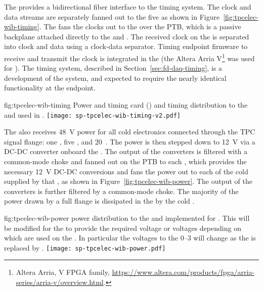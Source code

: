 The   provides a bidirectional fiber interface to the
timing system. The clock and data
streams are separately fanned out to the five  as shown in
Figure~\ref{fig:tpcelec-wib-timing}. The  fans the clocks out to the  over the
PTB, which is a passive backplane attached directly to the  and
.  The received clock on the  is separated into clock and
data using a clock-data separator. Timing endpoint firmware to receive and transmit
the clock is integrated in the   (the Altera Arria V\footnote{Altera Arria\texttrademark{}, V FPGA family, \url{https://www.altera.com/products/fpga/arria-series/arria-v/overview.html}.} was used for ).
The  timing system, described in Section~\ref{sec:fd-daq-timing}, is a development of the  system, and expected to require the nearly identical functionality at the  endpoint.

\begin{dunefigure}
{fig:tpcelec-wib-timing}
{Power and timing card () and timing distribution to the  and  used in .}
\texttt{[image: sp-tpcelec-wib-timing-v2.pdf]}
\end{dunefigure}

The  also receives \SI{48}{V}  power for all cold
electronics connected through the TPC signal flange: one , five , and \num{20}~. The  power is then stepped down
to \SI{12}{V} via a DC-DC converter onboard the . The output of the  converters is filtered with a common-mode choke and fanned out
on the PTB to each , which provides the necessary \SI{12}{V} DC-DC conversions and fans
the  power out to each of the cold  supplied by that , 
as shown in Figure~\ref{fig:tpcelec-wib-power}. The output of the  converters is further filtered by a common-mode choke. The 
majority of the power drawn by a full flange is dissipated in the \lar by the cold .

\begin{dunefigure}
{fig:tpcelec-wib-power}
{ power distribution to the  and  implemented for . This will be modified for the  to provide the required voltage or voltages depending on which  are used on the . In particular the voltages to the  \numrange{0}{3} will change as the   is replaced by . }
\texttt{[image: sp-tpcelec-wib-power.pdf]}
\end{dunefigure}

